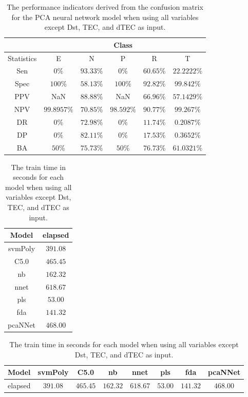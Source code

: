 \begin{table}[!ht]
	\centering
	\begin{tabular}{|c|c|c|c|c|c|}
		\hline
		 & \multicolumn{5}{c|}{Class} \\ \hline
		Statistics & E & N & P & R & T \\ \hline
		Sen & $0\%$ & $93.33\%$ & $0\%$ & $60.65\%$ & $22.2222\%$ \\ \hline
		Spec & $100\%$ & $58.13\%$ & $100\%$ & $92.82\%$ & $99.842\%$ \\ \hline
		PPV & NaN & $88.88\%$ & NaN & $66.96\%$ & $57.1429\%$ \\ \hline
		NPV & $99.8957\%$ & $70.85\%$ & $98.592\%$ & $90.77\%$ & $99.267\%$ \\ \hline
		DR & $0\%$ & $72.98\%$ & $0\%$ & $11.74\%$ & $0.2087\%$ \\ \hline
		DP & $0\%$ & $82.11\%$ & $0\%$ & $17.53\%$ & $0.3652\%$ \\ \hline
		BA & $50\%$ & $75.73\%$ & $50\%$ & $76.73\%$ & $61.0321\%$ \\ \hline
	\end{tabular}
	\caption{The performance indicators derived from the confusion matrix for the PCA neural network model when using all variables except Dst, TEC, and dTEC as input.}
	\label{tab:cs:reverse:noTEC:pcaNNet}
\end{table}

\begin{table}[!ht]
	\centering
	\begin{tabular}{|c|c|}
		\hline
		Model & elapsed \\ \hline
		svmPoly & $391.08$ \\ \hline
		C5.0 & $465.45$ \\ \hline
		nb & $162.32$ \\ \hline
		nnet & $618.67$ \\ \hline
		pls & $53.00$ \\ \hline
		fda & $141.32$ \\ \hline
		pcaNNet & $468.00$ \\ \hline
	\end{tabular}
	\caption{The train time in seconds for each model when using all variables except Dst, TEC, and dTEC as input.}
	\label{tab:time:noTEC:train}
\end{table}

\begin{table}[!ht]
	\centering
	\begin{tabular}{|c|c|c|c|c|c|c|c|}
		\hline
		Model & svmPoly & C5.0 & nb & nnet & pls & fda & pcaNNet \\ \hline
		elapsed & $391.08$ & $465.45$ & $162.32$ & $618.67$ & $53.00$ & $141.32$ & $468.00$ \\ \hline
	\end{tabular}
	\caption{The train time in seconds for each model when using all variables except Dst, TEC, and dTEC as input.}
	\label{tab:time:reverse:noTEC:train}
\end{table}

